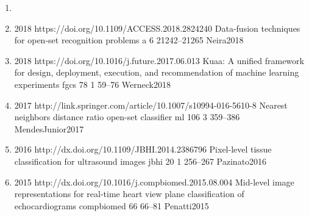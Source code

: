 \begin{enumerate}
\item{}
\item{}
  {
  }
  {2018}
  {https://doi.org/10.1109/ACCESS.2018.2824240}
  {Data-fusion techniques for open-set recognition problems}
  {a}
  {6}
  {}
  {21242--21265}
  {Neira2018}
\item{}
  {
  }
  {2018}
  {https://doi.org/10.1016/j.future.2017.06.013}
  {Kuaa: A unified framework for design, deployment, execution, and recommendation of machine learning experiments}
  {fgcs}
  {78}
  {1}
  {59--76}
  {Werneck2018}
\item{}
  {
  }
  {2017}
  {http://link.springer.com/article/10.1007/s10994-016-5610-8}
  {Nearest neighbors distance ratio open-set classifier}
  {ml}
  {106}
  {3}
  {359--386}
  {MendesJunior2017}
\item{}
  {
  }
  {2016}
  {http://dx.doi.org/10.1109/JBHI.2014.2386796}
  {Pixel-level tissue classification for ultrasound images}
  {jbhi}
  {20}
  {1}
  {256--267}
  {Pazinato2016}
\item{}
  {
  }
  {2015}
  {http://dx.doi.org/10.1016/j.compbiomed.2015.08.004}
  {Mid-level image representations for real-time heart view plane classification of echocardiograms}
  {compbiomed}
  {66}
  {}
  {66--81}
  {Penatti2015}
\end{enumerate}

